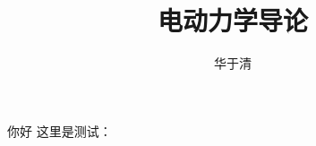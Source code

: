 \documentclass{first} %
\title{电动力学导论}
\author{华于清}
\begin{document}
    \maketitle
    你好
    这里是测试：
\end{document}
